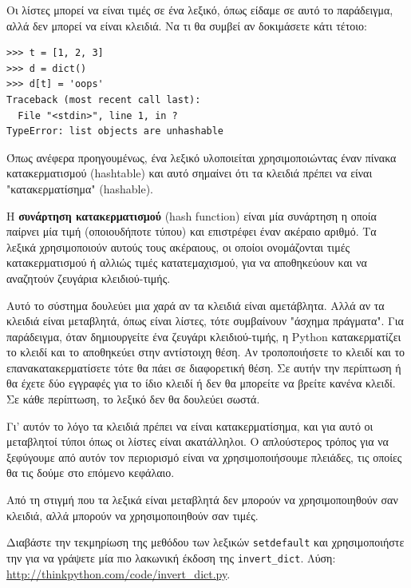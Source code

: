 \documentclass[10pt]{book}
\begin{document}
Οι λίστες μπορεί να είναι τιμές σε ένα λεξικό, όπως είδαμε σε αυτό το παράδειγμα, αλλά δεν μπορεί να είναι κλειδιά. Να τι θα συμβεί αν δοκιμάσετε κάτι τέτοιο:


\begin{verbatim}
>>> t = [1, 2, 3]
>>> d = dict()
>>> d[t] = 'oops'
Traceback (most recent call last):
  File "<stdin>", line 1, in ?
TypeError: list objects are unhashable
\end{verbatim}
%
Όπως ανέφερα προηγουμένως, ένα λεξικό υλοποιείται χρησιμοποιώντας έναν πίνακα κατακερματισμού (hashtable) και αυτό σημαίνει ότι τα κλειδιά πρέπει να είναι "κατακερματίσημα" (hashable).

Η {\bf συνάρτηση κατακερματισμού} (hash function) είναι μία συνάρτηση η οποία παίρνει μία τιμή (οποιουδήποτε τύπου) και επιστρέφει έναν ακέραιο αριθμό. Τα λεξικά χρησιμοποιούν αυτούς τους ακέραιους, οι οποίοι ονομάζονται τιμές κατακερματισμού ή αλλιώς τιμές κατατεμαχισμού, για να αποθηκεύουν και να αναζητούν ζευγάρια κλειδιού-τιμής.

Αυτό το σύστημα δουλεύει μια χαρά αν τα κλειδιά είναι αμετάβλητα. Αλλά αν τα κλειδιά είναι μεταβλητά, όπως είναι λίστες, τότε συμβαίνουν "άσχημα πράγματα".  Για παράδειγμα, όταν δημιουργείτε ένα ζευγάρι κλειδιού-τιμής, η  Python  κατακερματίζει το κλειδί και το αποθηκεύει στην αντίστοιχη θέση. Αν τροποποιήσετε το κλειδί και το επανακατακερματίσετε τότε θα πάει σε διαφορετική θέση. Σε αυτήν την περίπτωση ή θα έχετε δύο εγγραφές για το ίδιο κλειδί ή δεν θα μπορείτε να βρείτε κανένα κλειδί. Σε κάθε περίπτωση, το λεξικό δεν θα δουλεύει σωστά.

Γι' αυτόν το λόγο τα κλειδιά πρέπει να είναι κατακερματίσημα, και για αυτό οι μεταβλητοί τύποι όπως οι λίστες είναι ακατάλληλοι. Ο απλούστερος τρόπος για να ξεφύγουμε από αυτόν τον περιορισμό είναι να χρησιμοποιήσουμε πλειάδες, τις οποίες θα τις δούμε στο επόμενο κεφάλαιο.

Από τη στιγμή που τα λεξικά είναι μεταβλητά δεν μπορούν να χρησιμοποιηθούν σαν κλειδιά, αλλά μπορούν να χρησιμοποιηθούν σαν τιμές.
\\
\begin{exercise}

Διαβάστε την τεκμηρίωση της μεθόδου των λεξικών {\tt setdefault} και χρησιμοποιήστε την για να γράψετε μία πιο λακωνική έκδοση της  \verb"invert_dict". Λύση: \url{http://thinkpython.com/code/invert_dict.py}.
\end{exercise}
\end{document}
